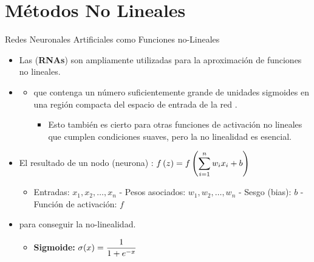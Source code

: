 \documentclass[10pt, envcountsect, handout, aspectratio=1610, hyperref={hypertexnames=true}]{beamer}
\begin{document}

\section{Métodos No Lineales}




\begin{frame}{Redes Neuronales Artificiales como Funciones no-Lineales}
	\begin{itemize}
		\item Las  (\textbf{RNAs}) son ampliamente utilizadas para la aproximación de funciones no lineales.
		\item {} 
		\begin{itemize}
			\item{} que contenga un número suficientemente grande de unidades sigmoides  en una región compacta del espacio de entrada de la red  \citep{cybenko1989approximation}.
			
			\begin{itemize}
				\item Esto también es cierto para otras funciones de activación no lineales que cumplen condiciones suaves, pero la no linealidad es esencial.
			\end{itemize}
		\end{itemize}
		
		
		
		\item El resultado de un nodo (neurona) : $\displaystyle f\left(z\right)=f\left( \sum_{i=1}^{n} w_i x_i + b \right)$
		
		
		\begin{itemize}
		 \item Entradas: \( x_1, x_2, \ldots, x_n \)  
		  - Pesos asociados: \( w_1, w_2, \ldots, w_n \)  
		  - Sesgo (bias): \( b \)  
		  - Función de activación: \( f \)  
		\end{itemize}
	
		
		\item {} para conseguir la no-linealidad.
		
			\begin{minipage}{.5\textwidth}
				\begin{itemize}					
					\item \textbf{Sigmoide:}  
					$\displaystyle
					\sigma(x) = \frac{1}{1 + e^{-x}}
					$
					

\end{itemize}
\end{minipage}
\end{itemize}
\end{frame}
\end{document}

